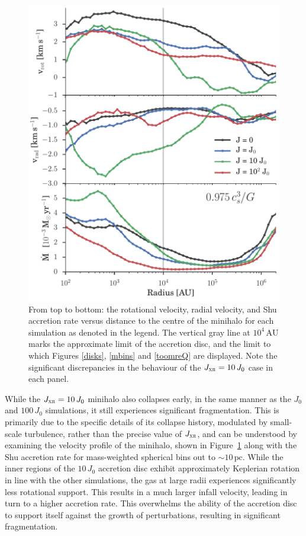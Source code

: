 \documentclass{thesis}
\newcommand{\pc}{\ensuremath{\,\mathrm{pc}}\xspace}
\newcommand{\au}{\ensuremath{\,\mathrm{AU}}\xspace}
\newcommand{\jxr}{\ensuremath{J_{\textsc{xr}}}\xspace}
\newcommand{\RefFig}[1]{\mbox{Figure~\ref{#1}}}
\begin{document}
\begin{figure}
  \begin{center}
    \includegraphics[width=\columnwidth]{figures/radial_bins/core_profile}
    \caption{From top to bottom: the rotational velocity, radial velocity, and Shu accretion rate versus distance to the centre of the minihalo for each simulation as denoted in the legend.  The vertical gray line at $10^4\au$ marks the approximate limit of the accretion disc, and the limit to which Figures \ref{disks}, \ref{mbins} and \ref{toomreQ} are displayed.  Note the significant discrepancies in the behaviour of the $\jxr=10\,J_0$ case in each panel.}
    \label{core_profile}
  \end{center}
\end{figure}
While the $\jxr=10\,J_0$ minihalo also collapses early, in the same manner as the $J_0$ and $100\,J_0$ simulations, it still experiences significant fragmentation.  This is primarily due to the specific details of its collapse history, modulated by small-scale turbulence, rather than the precise value of \jxr, and can be understood by examining the velocity profile of the minihalo, shown in \RefFig{core_profile} along with the Shu accretion rate \citep{Shu1977} for mass-weighted spherical bins out to $\sim$$10\pc$. While the inner regions of the $10\,J_0$ accretion disc exhibit approximately Keplerian rotation in line with the other simulations, the gas at large radii experiences significantly less rotational support.  This results in a much larger infall velocity, leading in turn to a higher accretion rate.  This overwhelms the ability of the accretion disc to support itself against the growth of perturbations, resulting in significant fragmentation.
\end{document}
